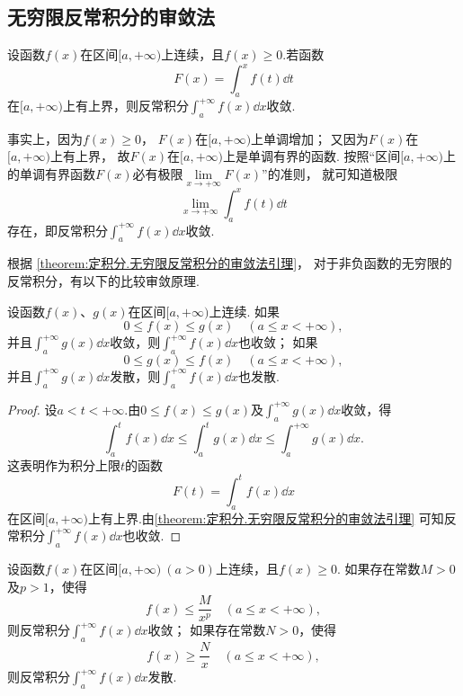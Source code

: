 \subsection{无穷限反常积分的审敛法}
\begin{theorem}\label{theorem:定积分.无穷限反常积分的审敛法引理}
设函数\(f(x)\)在区间\([a,+\infty)\)上连续，且\(f(x) \geqslant 0\).若函数\[
F(x)=\int_a^x f(t) \dd{t}
\]在\([a,+\infty)\)上有上界，则反常积分\(\int_a^{+\infty} f(x) \dd{x}\)收敛.
\end{theorem}
事实上，因为\(f(x)\geqslant0\)，%
\(F(x)\)在\([a,+\infty)\)上单调增加；
又因为\(F(x)\)在\([a,+\infty)\)上有上界，%
故\(F(x)\)在\([a,+\infty)\)上是单调有界的函数.
按照“区间\([a,+\infty)\)上的单调有界函数\(F(x)\)必有极限\(\lim\limits_{x\to+\infty} F(x)\)”的准则，%
就可知道极限\[
\lim\limits_{x\to+\infty} \int_a^x f(t) \dd{t}
\]存在，即反常积分\(\int_a^{+\infty} f(x) \dd{x}\)收敛.

根据 \cref{theorem:定积分.无穷限反常积分的审敛法引理}，%
对于非负函数的无穷限的反常积分，有以下的比较审敛原理.
\begin{theorem}[比较审敛原理]\label{theorem:定积分.无穷限反常积分的比较审敛原理}
设函数\(f(x)\)、\(g(x)\)在区间\([a,+\infty)\)上连续.
如果\[
0 \leqslant f(x) \leqslant g(x) \quad (a \leqslant x < +\infty),
\]并且\(\int_a^{+\infty} g(x) \dd{x}\)收敛，则\(\int_a^{+\infty} f(x) \dd{x}\)也收敛；
如果\[
0 \leqslant g(x) \leqslant f(x) \quad (a \leqslant x < +\infty),
\]并且\(\int_a^{+\infty} g(x) \dd{x}\)发散，则\(\int_a^{+\infty} f(x) \dd{x}\)也发散.
\begin{proof}
设\(a < t < +\infty\).由\(0 \leqslant f(x) \leqslant g(x)\)及\(\int_a^{+\infty} g(x) \dd{x}\)收敛，得\[
\int_a^t f(x) \dd{x}
\leqslant
\int_a^t g(x) \dd{x}
\leqslant
\int_a^{+\infty} g(x) \dd{x}.
\]这表明作为积分上限\(t\)的函数\[
F(t) = \int_a^t f(x) \dd{x}
\]在区间\([a,+\infty)\)上有上界.由\cref{theorem:定积分.无穷限反常积分的审敛法引理} 可知反常积分\(\int_a^{+\infty} f(x) \dd{x}\)也收敛.
\end{proof}
\end{theorem}

\begin{theorem}[比较审敛法]\label{theorem:定积分.无穷限反常积分的比较审敛法}
设函数\(f(x)\)在区间\([a,+\infty)\ (a>0)\)上连续，且\(f(x) \geqslant 0\).
如果存在常数\(M>0\)及\(p>1\)，使得\[
f(x) \leqslant \frac{M}{x^p} \quad (a \leqslant x < +\infty),
\]则反常积分\(\int_a^{+\infty} f(x) \dd{x}\)收敛；
如果存在常数\(N>0\)，使得\[
f(x) \geqslant \frac{N}{x} \quad (a \leqslant x < +\infty),
\]则反常积分\(\int_a^{+\infty} f(x) \dd{x}\)发散.
\end{theorem}

